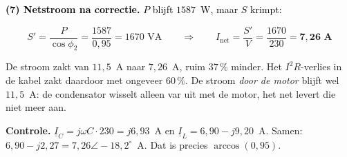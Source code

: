 \documentclass[a4paper,11pt]{article}
\newcommand{\stapreden}[1]{\par\vspace{1.4mm}\noindent\textcolor{black}{#1}\par\vspace{-2mm}}
\begin{document}
\begin{oefening}
    \stapreden{\textbf{(7) Netstroom na correctie.} $P$ blijft $1587$~W, maar $S$ krimpt:}
    \[S' = \frac{P}{\cos\phi_2} = \frac{1587}{0{,}95} = 1670\text{ VA}
        \qquad\Longrightarrow\qquad
        I_{\text{net}} = \frac{S'}{V} = \frac{1670}{230} = \mathbf{7{,}26\text{ A}}\]

    De stroom zakt van $11{,}5$~A naar $7{,}26$~A, ruim $37\,\%$ minder. Het $I^2R$-verlies in de
    kabel zakt daardoor met ongeveer $60\,\%$. De stroom \emph{door de motor} blijft wel $11{,}5$~A:
    de condensator wisselt alleen var uit met de motor, het net levert die niet meer aan.

    \textbf{Controle.} $\underline{I}_C = j\omega C \cdot 230 = j6{,}93$~A en
    $\underline{I}_L = 6{,}90 - j9{,}20$~A. Samen: $6{,}90 - j2{,}27 = 7{,}26\angle -18{,}2^\circ$~A.
    Dat is precies $\arccos(0{,}95)$.
\end{oefening}
\end{document}
